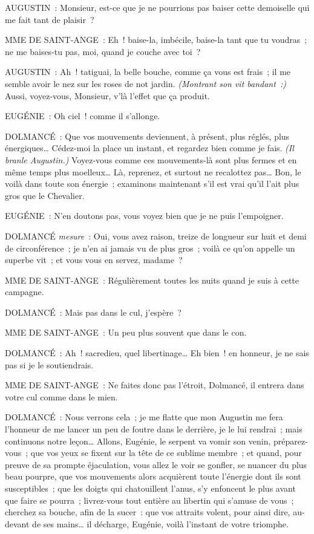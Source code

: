 \documentclass[french,twoside]{book} %
\begin{document}
AUGUSTIN : Monsieur, est-ce que je ne pourrions pas baiser cette demoiselle qui me fait tant de plaisir ?\par
MME DE SAINT-ANGE : Eh ! baise-la, imbécile, baise-la tant que tu voudras ; ne me baises-tu pas, moi, quand je couche avec toi ?\par
AUGUSTIN : Ah ! tatiguai, la belle bouche, comme ça vous est frais ; il me semble avoir le nez sur les roses de not jardin. {\itshape (Montrant son vit bandant :)} Aussi, voyez-vous, Monsieur, v’là l’effet que ça produit.\par
EUGÉNIE : Oh ciel ! comme il s’allonge.\par
DOLMANCÉ : Que vos mouvements deviennent, à présent, plus réglés, plus énergiques… Cédez-moi la place un instant, et regardez bien comme je fais. {\itshape (Il branle Augustin.)} Voyez-vous comme ces mouvements-là sont plus fermes et en même temps plus moelleux… Là, reprenez, et surtout ne recalottez pas… Bon, le voilà dans toute son énergie ; examinons maintenant s’il est vrai qu’il l’ait plus gros que le Chevalier.\par
EUGÉNIE : N’en doutons pas, vous voyez bien que je ne puis l’empoigner.\par
DOLMANCÉ {\itshape mesure} : Oui, vous avez raison, treize de longueur sur huit et demi de circonférence ; je n’en ai jamais vu de plus gros ; voilà ce qu’on appelle un superbe vit ; et vous vous en servez, madame ?\par
MME DE SAINT-ANGE : Régulièrement toutes les nuits quand je suis à cette campagne.\par
DOLMANCÉ : Mais pas dans le cul, j’espère ?\par
MME DE SAINT-ANGE : Un peu plus souvent que dans le con.\par
DOLMANCÉ : Ah ! sacredieu, quel libertinage… Eh bien ! en honneur, je ne sais pas si je le soutiendrais.\par
MME DE SAINT-ANGE : Ne faites donc pas l’étroit, Dolmancé, il entrera dans votre cul comme dans le mien.\par
DOLMANCÉ : Nous verrons cela ; je me flatte que mon Augustin me fera l’honneur de me lancer un peu de foutre dans le derrière, je le lui rendrai ; mais continuons notre leçon… Allons, Eugénie, le serpent va vomir son venin, préparez-vous ; que vos yeux se fixent sur la tête de ce sublime membre ; et quand, pour preuve de sa prompte éjaculation, vous allez le voir se gonfler, se nuancer du plus beau pourpre, que vos mouvements alors acquièrent toute l’énergie dont ils sont susceptibles ; que les doigts qui chatouillent l’anus, s’y enfoncent le plus avant que faire se pourra ; livrez-vous tout entière au libertin qui s’amuse de vous ; cherchez sa bouche, afin de la sucer : que vos attraits volent, pour ainsi dire, au-devant de ses mains… il décharge, Eugénie, voilà l’instant de votre triomphe.\par
\end{document}
